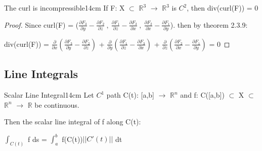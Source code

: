     \vspace{0.5cm}



    \begin{wtheorem}{The curl is incompressible}{14cm}
        If F: X $\subset$ $\mathbb{R}^3$ $\rightarrow$ $\mathbb{R}^3$
        is $C^2$, then div(curl(F)) = 0
    \end{wtheorem}

    \begin{proof}
        Since curl(F)
        = ($\frac{\partial F_3}{\partial y}-\frac{\partial F_2}{\partial z} \ , \
            \frac{\partial F_1}{\partial z}-\frac{\partial F_3}{\partial x} \ , \
            \frac{\partial F_2}{\partial x}-\frac{\partial F_1}{\partial y}$).
        then by {\color{red} theorem 2.3.9}:

        \hspace{0.5cm}
        div(curl(F))
        = $\frac{\partial}{\partial x}
            (\frac{\partial F_3}{\partial y}-\frac{\partial F_2}{\partial z})$
            + $\frac{\partial}{\partial y}
            (\frac{\partial F_1}{\partial z}-\frac{\partial F_3}{\partial x})$
            + $\frac{\partial}{\partial z}
            (\frac{\partial F_2}{\partial x}-\frac{\partial F_1}{\partial y})$
        = 0
    \end{proof}

    \vspace{0.5cm}





\subsection{ Line Integrals }

    \begin{wtheorem}{Scalar Line Integral}{14cm}
        Let $C^1$ path C(t): [a,b] $\rightarrow$ $\mathbb{R}^n$
        and f: C([a,b]) $\subset$ X $\subset$ $\mathbb{R}^n$ $\rightarrow$
        $\mathbb{R}$ be continuous.

        Then the {\color{lblue} scalar line integral}
        of f along C(t):

        \hspace{0.5cm}
        $\int_{C(t)}$ f ds = $\int_a^b$ f(C(t))$|| C'(t) ||$ dt
    \end{wtheorem}

